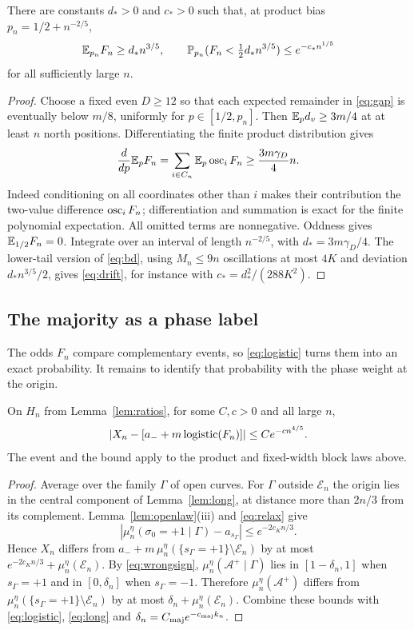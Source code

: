 \begin{lemma}\label{lem:drift}
There are constants $d_*>0$ and $c_*>0$ such that, at product bias $p_n=1/2+n^{-2/5}$,
\begin{equation}\label{eq:drift}
 \mathbb E_{p_n}F_n\ge d_* n^{3/5},\qquad
 \mathbb P_{p_n}(F_n<\tfrac12 d_*n^{3/5})\le e^{-c_*n^{1/5}}
\end{equation}
for all sufficiently large $n$.
\end{lemma}
\begin{proof}
Choose a fixed even $D\ge12$ so that each expected remainder in \eqref{eq:gap} is eventually below $m/8$, uniformly for $p\in[1/2,p_n]$. Then $\mathbb E_p d_v\ge3m/4$ at at least $n$ north positions. Differentiating the finite product distribution gives
\[
 \frac{d}{dp}\mathbb E_pF_n=\sum_{i\in C_n}\mathbb E_p\operatorname{osc}_iF_n
 \ge\frac{3m\gamma_D}{4}n.
\]
Indeed conditioning on all coordinates other than $i$ makes their contribution the two-value difference $\operatorname{osc}_iF_n$; differentiation and summation is exact for the finite polynomial expectation. All omitted terms are nonnegative. Oddness gives $\mathbb E_{1/2}F_n=0$. Integrate over an interval of length $n^{-2/5}$, with $d_*=3m\gamma_D/4$. The lower-tail version of \eqref{eq:bd}, using $M_n\le9n$ oscillations at most $4K$ and deviation $d_*n^{3/5}/2$, gives \eqref{eq:drift}, for instance with $c_*=d_*^2/(288K^2)$.
\end{proof}

\subsection{The majority as a phase label}
The odds $F_n$ compare complementary events, so \eqref{eq:logistic} turns them into an exact probability. It remains to identify that probability with the phase weight at the origin.

\begin{lemma}\label{lem:transfer}
On $H_n$ from Lemma~\ref{lem:ratios}, for some $C,c>0$ and all large $n$,
\begin{equation}\label{eq:transfer}
 \left|X_n-\left[a_-+m\operatorname{logistic}(F_n)\right]\right|
 \le Ce^{-c n^{4/5}}.
\end{equation}
The event and the bound apply to the product and fixed-width block laws above.
\end{lemma}
\begin{proof}
Average over the family $\Gamma$ of open curves. For $\Gamma$ outside $\mathcal E_n$ the origin lies in the central component of Lemma~\ref{lem:long}, at distance more than $2n/3$ from its complement. Lemma~\ref{lem:openlaw}(iii) and \eqref{eq:relax} give
\[
 \left|\mu_n^\eta(\sigma_0=+1\mid\Gamma)-a_{s_\Gamma}\right|\le e^{-2c_Kn/3}.
\]
Hence $X_n$ differs from $a_-+m\,\mu_n^\eta(\{s_\Gamma=+1\}\setminus\mathcal E_n)$ by at most $e^{-2c_Kn/3}+\mu_n^\eta(\mathcal E_n)$. By \eqref{eq:wrongsign}, $\mu_n^\eta(\mathcal A^+\mid\Gamma)$ lies in $[1-\delta_n,1]$ when $s_\Gamma=+1$ and in $[0,\delta_n]$ when $s_\Gamma=-1$. Therefore $\mu_n^\eta(\mathcal A^+)$ differs from $\mu_n^\eta(\{s_\Gamma=+1\}\setminus\mathcal E_n)$ by at most $\delta_n+\mu_n^\eta(\mathcal E_n)$. Combine these bounds with \eqref{eq:logistic}, \eqref{eq:long} and $\delta_n=C_{\rm maj}e^{-c_{\rm maj}k_n}$.
\end{proof}

